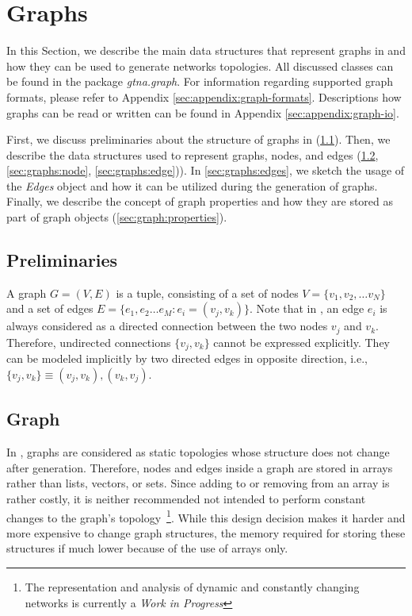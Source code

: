 
\section{Graphs}
\label{sec:graphs}

In this Section, we describe the main data structures that represent graphs in \gtna and how they can be used to generate networks topologies.
All discussed classes can be found in the package \emph{gtna.graph}.
For information regarding supported graph formats, please refer to Appendix \ref{sec:appendix:graph-formats}.
Descriptions how graphs can be read or written can be found in Appendix \ref{sec:appendix:graph-io}.

First, we discuss preliminaries about the structure of graphs in \gtna (\ref{sec:graphs:preliminaries}).
Then, we describe the data structures used to represent graphs, nodes, and edges (\ref{sec:graphs:graph}, \ref{sec:graphs:node}, \ref{sec:graphs:edge})).
In \ref{sec:graphs:edges}, we sketch the usage of the \emph{Edges} object and how it can be utilized during the generation of graphs.
Finally, we describe the concept of graph properties and how they are stored as part of graph objects (\ref{sec:graph:properties}).






\subsection{Preliminaries}
\label{sec:graphs:preliminaries}

A graph $G = (V, E)$ is a tuple, consisting of a set of nodes $V = \{v_1, v_2, \dots v_N\}$ and a set of edges $E = \{e_1, e_2 \dots e_M : e_i = (v_j, v_k)\}$.
Note that in \gtna, an edge $e_i$ is always considered as a directed connection between the two nodes $v_j$ and $v_k$.
Therefore, undirected connections $\{v_j, v_k\}$ cannot be expressed explicitly.
They can be modeled implicitly by two directed edges in opposite direction, i.e., $\{v_j, v_k\} \equiv (v_j, v_k), (v_k, v_j)$.





\subsection{Graph}
\label{sec:graphs:graph}

In \gtna, graphs are considered as static topologies whose structure does not change after generation.
Therefore, nodes and edges inside a graph are stored in arrays rather than lists, vectors, or sets.
Since adding to or removing from an array is rather costly, it is neither recommended not intended to perform constant changes to the graph's topology~\footnote{The representation and analysis of dynamic and constantly changing networks is currently a \emph{Work in Progress}}.
While this design decision makes it harder and more expensive to change graph structures, the memory required for storing these structures if much lower because of the use of arrays only.

